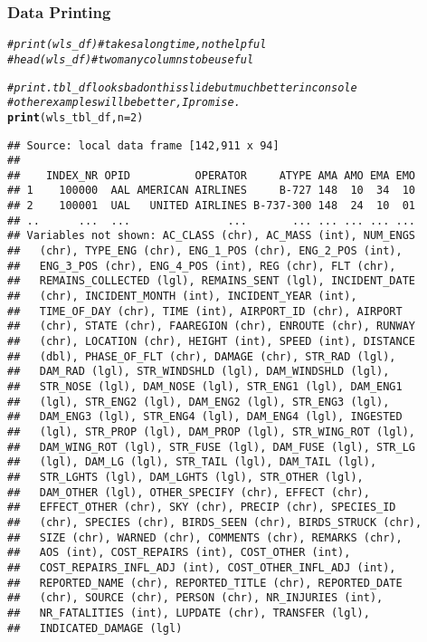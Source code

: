 \documentclass{beamer}\usepackage[]{graphicx}\usepackage[]{color}
\makeatletter
\newcommand{\hlnum}[1]{\textcolor[rgb]{0.686,0.059,0.569}{#1}}%
\newcommand{\hlcom}[1]{\textcolor[rgb]{0.678,0.584,0.686}{\textit{#1}}}%
\newcommand{\hlstd}[1]{\textcolor[rgb]{0.345,0.345,0.345}{#1}}%
\newcommand{\hlkwc}[1]{\textcolor[rgb]{0.333,0.667,0.333}{#1}}%
\newcommand{\hlkwd}[1]{\textcolor[rgb]{0.737,0.353,0.396}{\textbf{#1}}}%
\newenvironment{kframe}{%
 \def\at@end@of@kframe{}%
 \ifinner\ifhmode%
  \def\at@end@of@kframe{\end{minipage}}%
  \begin{minipage}{\columnwidth}%
 \fi\fi%
 \def\FrameCommand##1{\hskip\@totalleftmargin \hskip-\fboxsep
 \colorbox{shadecolor}{##1}\hskip-\fboxsep
     \hskip-\linewidth \hskip-\@totalleftmargin \hskip\columnwidth}%
 \MakeFramed {\advance\hsize-\width
   \@totalleftmargin\z@ \linewidth\hsize
   \@setminipage}}%
 {\par\unskip\endMakeFramed%
 \at@end@of@kframe}
\newenvironment{knitrout}{}{} %
\makeatother
\begin{document}
\begin{frame}[fragile]
  \frametitle{Data Printing}
\begin{knitrout}\footnotesize
{}\color{fgcolor}\begin{kframe}
\begin{alltt}
\hlcom{# print(wls_df)  # takes a long time, not helpful}
\hlcom{# head(wls_df)   # two many columns to be useful}

\hlcom{# print.tbl_df looks bad on this slide but much better in console}
\hlcom{# other examples will be better, I promise.}
\hlkwd{print}\hlstd{(wls_tbl_df,} \hlkwc{n} \hlstd{=} \hlnum{2}\hlstd{)}
\end{alltt}
\begin{verbatim}
## Source: local data frame [142,911 x 94]
## 
##    INDEX_NR OPID          OPERATOR     ATYPE AMA AMO EMA EMO
## 1    100000  AAL AMERICAN AIRLINES     B-727 148  10  34  10
## 2    100001  UAL   UNITED AIRLINES B-737-300 148  24  10  01
## ..      ...  ...               ...       ... ... ... ... ...
## Variables not shown: AC_CLASS (chr), AC_MASS (int), NUM_ENGS
##   (chr), TYPE_ENG (chr), ENG_1_POS (chr), ENG_2_POS (int),
##   ENG_3_POS (chr), ENG_4_POS (int), REG (chr), FLT (chr),
##   REMAINS_COLLECTED (lgl), REMAINS_SENT (lgl), INCIDENT_DATE
##   (chr), INCIDENT_MONTH (int), INCIDENT_YEAR (int),
##   TIME_OF_DAY (chr), TIME (int), AIRPORT_ID (chr), AIRPORT
##   (chr), STATE (chr), FAAREGION (chr), ENROUTE (chr), RUNWAY
##   (chr), LOCATION (chr), HEIGHT (int), SPEED (int), DISTANCE
##   (dbl), PHASE_OF_FLT (chr), DAMAGE (chr), STR_RAD (lgl),
##   DAM_RAD (lgl), STR_WINDSHLD (lgl), DAM_WINDSHLD (lgl),
##   STR_NOSE (lgl), DAM_NOSE (lgl), STR_ENG1 (lgl), DAM_ENG1
##   (lgl), STR_ENG2 (lgl), DAM_ENG2 (lgl), STR_ENG3 (lgl),
##   DAM_ENG3 (lgl), STR_ENG4 (lgl), DAM_ENG4 (lgl), INGESTED
##   (lgl), STR_PROP (lgl), DAM_PROP (lgl), STR_WING_ROT (lgl),
##   DAM_WING_ROT (lgl), STR_FUSE (lgl), DAM_FUSE (lgl), STR_LG
##   (lgl), DAM_LG (lgl), STR_TAIL (lgl), DAM_TAIL (lgl),
##   STR_LGHTS (lgl), DAM_LGHTS (lgl), STR_OTHER (lgl),
##   DAM_OTHER (lgl), OTHER_SPECIFY (chr), EFFECT (chr),
##   EFFECT_OTHER (chr), SKY (chr), PRECIP (chr), SPECIES_ID
##   (chr), SPECIES (chr), BIRDS_SEEN (chr), BIRDS_STRUCK (chr),
##   SIZE (chr), WARNED (chr), COMMENTS (chr), REMARKS (chr),
##   AOS (int), COST_REPAIRS (int), COST_OTHER (int),
##   COST_REPAIRS_INFL_ADJ (int), COST_OTHER_INFL_ADJ (int),
##   REPORTED_NAME (chr), REPORTED_TITLE (chr), REPORTED_DATE
##   (chr), SOURCE (chr), PERSON (chr), NR_INJURIES (int),
##   NR_FATALITIES (int), LUPDATE (chr), TRANSFER (lgl),
##   INDICATED_DAMAGE (lgl)
\end{verbatim}
\end{kframe}
\end{knitrout}
\end{frame} 
\end{document}
